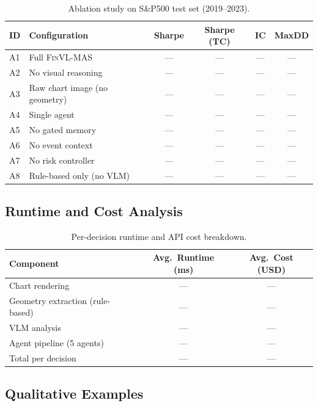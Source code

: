 \begin{table}[h]
\centering
\caption{Ablation study on S\&P500 test set (2019--2023).}
\label{tab:ablation_sp500}
\begin{tabular}{llcccc}
\toprule
ID & Configuration & Sharpe & Sharpe (TC) & IC & MaxDD \\
\midrule
A1 & Full \textsc{FinVL-MAS}            & --- & --- & --- & --- \\
A2 & No visual reasoning                & --- & --- & --- & --- \\
A3 & Raw chart image (no geometry)       & --- & --- & --- & --- \\
A4 & Single agent                        & --- & --- & --- & --- \\
A5 & No gated memory                     & --- & --- & --- & --- \\
A6 & No event context                    & --- & --- & --- & --- \\
A7 & No risk controller                  & --- & --- & --- & --- \\
A8 & Rule-based only (no VLM)            & --- & --- & --- & --- \\
\bottomrule
\end{tabular}
\end{table}

\subsection{Runtime and Cost Analysis}
\label{app:runtime}

\begin{table}[h]
\centering
\caption{Per-decision runtime and API cost breakdown.}
\label{tab:runtime}
\begin{tabular}{lcc}
\toprule
Component & Avg.\ Runtime (ms) & Avg.\ Cost (USD) \\
\midrule
Chart rendering & --- & --- \\
Geometry extraction (rule-based) & --- & --- \\
VLM analysis & --- & --- \\
Agent pipeline (5 agents) & --- & --- \\
Total per decision & --- & --- \\
\bottomrule
\end{tabular}
\end{table}

\subsection{Qualitative Examples}
\label{app:qualitative}

